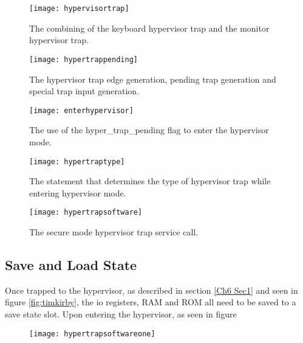 \begin{figure}
  \centering
  \texttt{[image: hypervisortrap]}
  \caption{The combining of the keyboard hypervisor trap and the monitor hypervisor trap.}
  \label{fig:hypervisortrap}
\end{figure}

\begin{figure}
  \centering
  \texttt{[image: hypertrappending]}
  \caption{The hypervisor trap edge generation, pending trap generation and special trap input generation.}
  \label{fig:hypertrappending}
\end{figure}

\begin{figure}
  \centering
  \texttt{[image: enterhypervisor]}
  \caption{The use of the hyper\_trap\_pending flag to enter the hypervisor mode.}
  \label{fig:enterhypervisor}
\end{figure}

\begin{figure}
  \centering
  \texttt{[image: hypertraptype]}
  \caption{The statement that determines the type of hypervisor trap while entering hypervisor mode.}
  \label{fig:hypertraptype}
\end{figure}

\begin{figure}
  \centering
  \texttt{[image: hypertrapsoftware]}
  \caption{The secure mode hypervisor trap service call.}
  \label{fig:hypertrapsoftware}
\end{figure}


\subsection{Save and Load State}

\label{Ch6 Sec3 Sub2}

Once trapped to the hypervisor, as described in section \ref{Ch6 Sec1} and seen in figure \ref{fig:timkirby}, the io registers, RAM and ROM all need to be saved to a save state slot. Upon entering the hypervisor, as seen in figure

\begin{figure}
  \centering
  \texttt{[image: hypertrapsoftwareone]}
  \caption{}
  \label{fig:hypertrapsoftwareone}
\end{figure}

